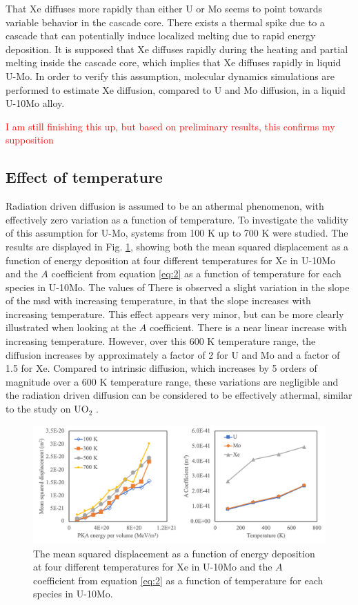 \documentclass[review]{elsarticle}
\begin{document}
That Xe diffuses more rapidly than either U or Mo seems to point towards variable behavior in the cascade core. There exists a thermal spike due to a cascade that can potentially induce localized melting due to rapid energy deposition. It is supposed that Xe diffuses rapidly during the heating and partial melting inside the cascade core, which implies that Xe diffuses rapidly in liquid U-Mo. In order to verify this assumption, molecular dynamics simulations are performed to estimate Xe diffusion, compared to U and Mo diffusion, in a liquid U-10Mo alloy. 

\textcolor{red}{I am still finishing this up, but based on preliminary results, this confirms my supposition} 



\FloatBarrier

\subsection{Effect of temperature}

Radiation driven diffusion is assumed to be an athermal phenomenon, with effectively zero variation as a function of temperature. To investigate the validity of this assumption for U-Mo, systems from 100 K up to 700 K were studied. The results are displayed in Fig. \ref{fig:msdT}, showing both the mean squared displacement as a function of energy deposition at four different temperatures for Xe in U-10Mo and the $A$ coefficient from equation \ref{eq:2} as a function of temperature for each species in U-10Mo. The values of There is observed a slight variation in the slope of the msd with increasing temperature, in that the slope increases with increasing temperature. This effect appears very minor, but can be more clearly illustrated when looking at the $A$ coefficient. There is a near linear increase with increasing temperature. However, over this 600 K temperature range, the diffusion increases by approximately a factor of 2 for U and Mo and a factor of 1.5 for Xe. Compared to intrinsic diffusion, which increases by 5 orders of magnitude over a 600 K temperature range, these variations are negligible and the radiation driven diffusion can be considered to be effectively athermal, similar to the study on UO$_2$ \cite{cooper2016}. 

\begin{figure}[h]
 \centering
 \includegraphics[width=1.0\textwidth]{msdT.png} 
 \caption{The mean squared displacement as a function of energy deposition at four different temperatures for Xe in U-10Mo and the $A$ coefficient from equation \ref{eq:2} as a function of temperature for each species in U-10Mo. }
 \label{fig:msdT}
\end{figure}
\end{document}
